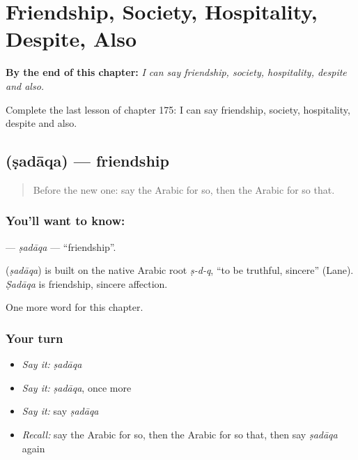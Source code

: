 
\chapter{Friendship, Society, Hospitality, Despite, Also}
\label{ch:ar-friendship-society-hospitality-despite-also}

\begin{chapteropening}
\textbf{By the end of this chapter:} \emph{I can say friendship, society, hospitality, despite and also.}

Complete the last lesson of chapter 175: I can say friendship, society, hospitality, despite and also.
\end{chapteropening}

\section[\texorpdfstring{\ar{صداقة} (ṣadāqa)}{صداقة (ṣadāqa)}]{ (ṣadāqa) — friendship}

\label{lesson:AR-C175-sadaqa}



\begin{quote}
Before the new one: say the Arabic for so, then the Arabic for so that.
\end{quote}

\subsection*{You'll want to know: }
\textbf{} — \emph{ṣadāqa} — \textquotedblleft{}friendship\textquotedblright{}.

\begin{cousinweb}
\textbf{} (\emph{ṣadāqa}) is built on the native Arabic root \emph{ṣ-d-q}, \textquotedblleft{}to be truthful, sincere\textquotedblright{} (Lane). \emph{Ṣadāqa} is friendship, sincere affection.
\end{cousinweb}

\begin{grammarlens}[title={What you've built}]
One more word for this chapter.
\end{grammarlens}

\subsection*{Your turn}
\begin{itemize}
\raggedright
  \item \emph{Say it:} \emph{ṣadāqa}
  \item \emph{Say it:} \emph{ṣadāqa}, once more
  \item \emph{Say it:} say \emph{ṣadāqa}
  \item \emph{Recall:} say the Arabic for so, then the Arabic for so that, then say \emph{ṣadāqa} again
\end{itemize}


